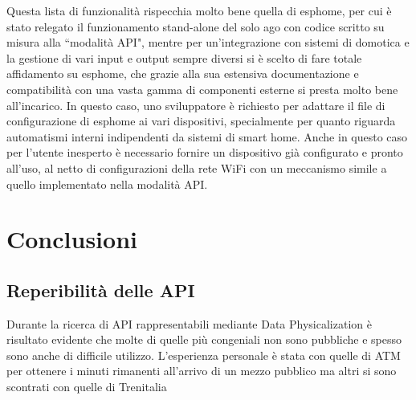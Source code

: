 \documentclass[12pt,a4paper]{report}
\begin{document}
Questa lista di funzionalità rispecchia molto bene quella di esphome, per cui è stato relegato il funzionamento stand-alone del solo ago
con codice scritto su misura alla ``modalità API", mentre per un'integrazione con sistemi di domotica e la gestione di vari input e output
sempre diversi si è scelto di fare totale affidamento su esphome, che grazie alla sua estensiva documentazione e compatibilità con una vasta
gamma di componenti esterne si presta molto bene all'incarico. \cite{esphomeio}
In questo caso, uno sviluppatore è richiesto per adattare il file di configurazione di esphome ai vari dispositivi, specialmente per quanto riguarda
automatismi interni indipendenti da sistemi di smart home. Anche in questo caso per l'utente inesperto è necessario fornire un dispositivo già
configurato e pronto all'uso, al netto di configurazioni della rete WiFi con un meccanismo simile a quello implementato nella modalità API.

\chapter{Conclusioni}



\section{Reperibilità delle API}
Durante la ricerca di API rappresentabili mediante Data Physicalization è risultato evidente che molte di quelle più congeniali non
sono pubbliche e spesso sono anche di difficile utilizzo. L'esperienza personale è stata con quelle di ATM per ottenere i minuti rimanenti
all'arrivo di un mezzo pubblico ma altri si sono scontrati con quelle di Trenitalia \cite{trenitaliashock}
\end{document}
